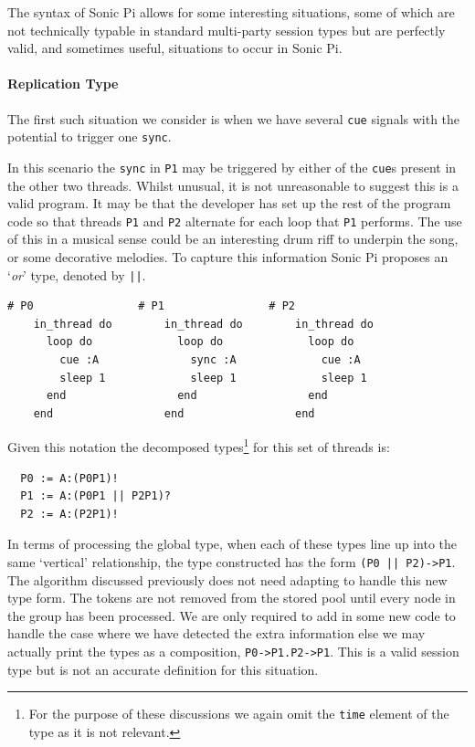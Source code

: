 \documentclass[11pt, abstracton, twoside, titlepage=true]{scrartcl}
\begin{document}
The syntax of Sonic Pi allows for some interesting situations,
some of which are not technically typable in standard multi-party session types 
but are perfectly valid, and sometimes useful, situations to occur in Sonic Pi.
\newpage

\paragraph{Replication Type}
The first such situation we consider is when we have several \texttt{cue}
signals with the potential to trigger one \texttt{sync}.

In this scenario the \texttt{sync} in \texttt{P1} may be triggered by either
of the \texttt{cue}s present in the other two threads. Whilst unusual,
it is not unreasonable to suggest this is a valid program. It may be that the
developer has set up the rest of the program code so that threads \texttt{P1} 
and \texttt{P2} alternate for each loop that \texttt{P1} performs. The use
of this in a musical sense could be an interesting drum riff to underpin the
song, or some decorative melodies. To capture this information Sonic Pi 
proposes an `\emph{or}' type, denoted by \texttt{||}. 


\begin{minipage}{\textwidth}
	\begin{lstlisting}[style = sonicpi]
    # P0                # P1                # P2
    in_thread do        in_thread do        in_thread do
      loop do             loop do             loop do
        cue :A              sync :A             cue :A
        sleep 1             sleep 1             sleep 1
      end                 end                 end
    end                 end                 end
	\end{lstlisting}
\end{minipage}


Given this notation the decomposed types\footnote{For the purpose of these discussions
we again omit the \texttt{time} element of the type as it is not relevant.} for this 
set of threads is:
\\
\begin{lstlisting}
  P0 := A:(P0P1)!
  P1 := A:(P0P1 || P2P1)?
  P2 := A:(P2P1)!
\end{lstlisting}

In terms of processing the global type, when each of these types line up
into the same `vertical' relationship, the type constructed has the form 
\texttt{(P0 || P2)->P1}. The algorithm discussed previously does not need
adapting to handle this new type form. The tokens are not removed from the
stored pool until every node in the group has been processed. We are only
required to add in some new code to handle the case where we have detected
the extra information else we may actually print the types as a composition,
\texttt{P0->P1.P2->P1}. This is a valid session type but is not an accurate
definition for this situation.
\end{document}
